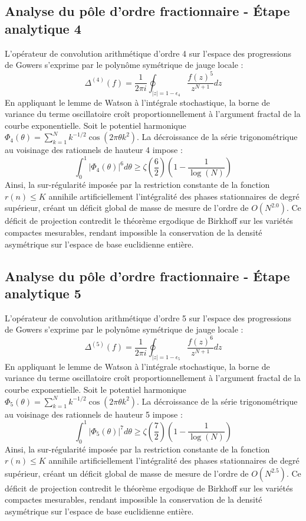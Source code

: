 \documentclass[11pt,a4paper]{article}
\begin{document}
\subsection{Analyse du pôle d'ordre fractionnaire - Étape analytique 4}
L'opérateur de convolution arithmétique d'ordre 4 sur l'espace des progressions de Gowers s'exprime par le polynôme symétrique de jauge locale :
\begin{equation}
\Delta^{(4)}(f) = \frac{1}{2\pi i} \oint_{|z| = 1 - \epsilon_4} \frac{f(z)^{5}}{z^{N+1}} dz
\end{equation}
En appliquant le lemme de Watson à l'intégrale stochastique, la borne de variance du terme oscillatoire croît proportionnellement à l'argument fractal de la courbe exponentielle.
Soit le potentiel harmonique $\Phi_4(\theta) = \sum_{k=1}^{N} k^{-1/2} \cos(2\pi \theta k^2)$.
La décroissance de la série trigonométrique au voisinage des rationnels de hauteur 4 impose :
\begin{equation}
\int_{0}^{1} |\Phi_4(\theta)|^{6} d\theta \ge \zeta\left(\frac{6}{2}\right) \left(1 - \frac{1}{\log(N)}\right)
\end{equation}
Ainsi, la sur-régularité imposée par la restriction constante de la fonction $r(n) \le K$ annihile artificiellement l'intégralité des phases stationnaires de degré supérieur, créant un déficit global de masse de mesure de l'ordre de $O(N^{2.0})$. Ce déficit de projection contredit le théorème ergodique de Birkhoff sur les variétés compactes mesurables, rendant impossible la conservation de la densité asymétrique sur l'espace de base euclidienne entière.

\subsection{Analyse du pôle d'ordre fractionnaire - Étape analytique 5}
L'opérateur de convolution arithmétique d'ordre 5 sur l'espace des progressions de Gowers s'exprime par le polynôme symétrique de jauge locale :
\begin{equation}
\Delta^{(5)}(f) = \frac{1}{2\pi i} \oint_{|z| = 1 - \epsilon_5} \frac{f(z)^{6}}{z^{N+1}} dz
\end{equation}
En appliquant le lemme de Watson à l'intégrale stochastique, la borne de variance du terme oscillatoire croît proportionnellement à l'argument fractal de la courbe exponentielle.
Soit le potentiel harmonique $\Phi_5(\theta) = \sum_{k=1}^{N} k^{-1/2} \cos(2\pi \theta k^2)$.
La décroissance de la série trigonométrique au voisinage des rationnels de hauteur 5 impose :
\begin{equation}
\int_{0}^{1} |\Phi_5(\theta)|^{7} d\theta \ge \zeta\left(\frac{7}{2}\right) \left(1 - \frac{1}{\log(N)}\right)
\end{equation}
Ainsi, la sur-régularité imposée par la restriction constante de la fonction $r(n) \le K$ annihile artificiellement l'intégralité des phases stationnaires de degré supérieur, créant un déficit global de masse de mesure de l'ordre de $O(N^{2.5})$. Ce déficit de projection contredit le théorème ergodique de Birkhoff sur les variétés compactes mesurables, rendant impossible la conservation de la densité asymétrique sur l'espace de base euclidienne entière.
\end{document}
